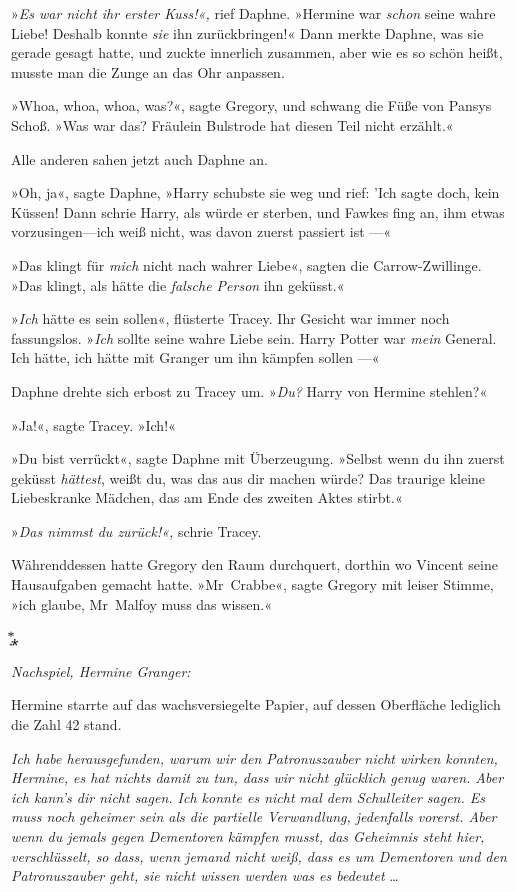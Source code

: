 {»\emph{Es war nicht ihr erster Kuss!«,} rief Daphne. »Hermine war \emph{schon} seine wahre Liebe! Deshalb konnte \emph{sie} ihn zurückbringen!« Dann merkte Daphne, was sie gerade gesagt hatte, und zuckte innerlich zusammen, aber wie es so schön heißt, musste man die Zunge an das Ohr anpassen.

»Whoa, whoa, whoa, was?«, sagte Gregory, und schwang die Füße von Pansys Schoß. »Was war das? Fräulein Bulstrode hat diesen Teil nicht erzählt.«

Alle anderen sahen jetzt auch Daphne an.

»Oh, ja«, sagte Daphne, »Harry schubste sie weg und rief: 'Ich sagte doch, kein Küssen! Dann schrie Harry, als würde er sterben, und Fawkes fing an, ihm etwas vorzusingen—ich weiß nicht, was davon zuerst passiert ist —«

»Das klingt für \emph{mich} nicht nach wahrer Liebe«, sagten die Carrow-Zwillinge. »Das klingt, als hätte die \emph{falsche Person} ihn geküsst.«

»\emph{Ich} hätte es sein sollen«, flüsterte Tracey. Ihr Gesicht war immer noch fassungslos. »\emph{Ich} sollte seine wahre Liebe sein. Harry Potter war \emph{mein} General. Ich hätte, ich hätte mit Granger um ihn kämpfen sollen —«

Daphne drehte sich erbost zu Tracey um. »\emph{Du?} Harry von Hermine stehlen?«

»Ja!«, sagte Tracey. »Ich!«

»Du bist verrückt«, sagte Daphne mit Überzeugung. »Selbst wenn du ihn zuerst geküsst \emph{hättest}, weißt du, was das aus dir machen würde? Das traurige kleine Liebeskranke Mädchen, das am Ende des zweiten Aktes stirbt.«

»\emph{Das nimmst du zurück!«,} schrie Tracey.

Währenddessen hatte Gregory den Raum durchquert, dorthin wo Vincent seine Hausaufgaben gemacht hatte. »Mr~Crabbe«, sagte Gregory mit leiser Stimme, »ich glaube, Mr~Malfoy muss das wissen.«

͙⃰⁎

\emph{Nachspiel, Hermine Granger:}

Hermine starrte auf das wachsversiegelte Papier, auf dessen Oberfläche lediglich die Zahl 42 stand.

\emph{Ich habe herausgefunden, warum wir den Patronuszauber nicht wirken konnten, Hermine, es hat nichts damit zu tun, dass wir nicht glücklich genug waren. Aber ich kann's dir nicht sagen. Ich konnte es nicht mal dem Schulleiter sagen. Es muss noch geheimer sein als die partielle Verwandlung, jedenfalls vorerst. Aber wenn du jemals gegen Dementoren kämpfen musst, das Geheimnis steht hier, verschlüsselt, so dass, wenn jemand nicht weiß, dass es um Dementoren und den Patronuszauber geht, sie nicht wissen werden was es bedeutet} …

}
